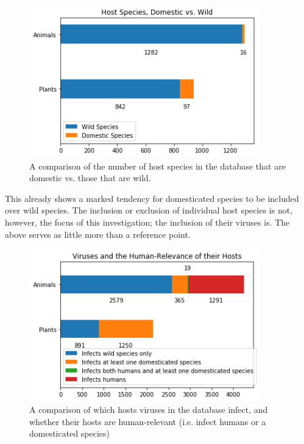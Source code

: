 \documentclass[12pt]{article}
\begin{document}
    \begin{figure}[H]
        \begin{center}
            \includegraphics[width=100mm]{host_species_domestic_wild_figure.png}
            \caption{A comparison of the number of host species in the database
            that are domestic vs. those that are wild.}
            \label{host_species_domestic_wild_figure}
        \end{center}
    \end{figure}
    
    This already shows a marked tendency for domesticated species to be included
    over wild species. The inclusion or exclusion of individual host species is
    not, however, the focus of this investigation; the inclusion of their viruses
    is. The above serves as little more than a reference point.
    
    \begin{figure}[H]
        \begin{center}
            \includegraphics[width=100mm]{viruses_human_relevance.png}
            \caption{A comparison of which hosts viruses in the database
            infect, and whether their hosts are human-relevant (i.e. infect
            humans or a domesticated species)}
            \label{viruses_human_relevance_figure}
        \end{center}
    \end{figure}
\end{document}

